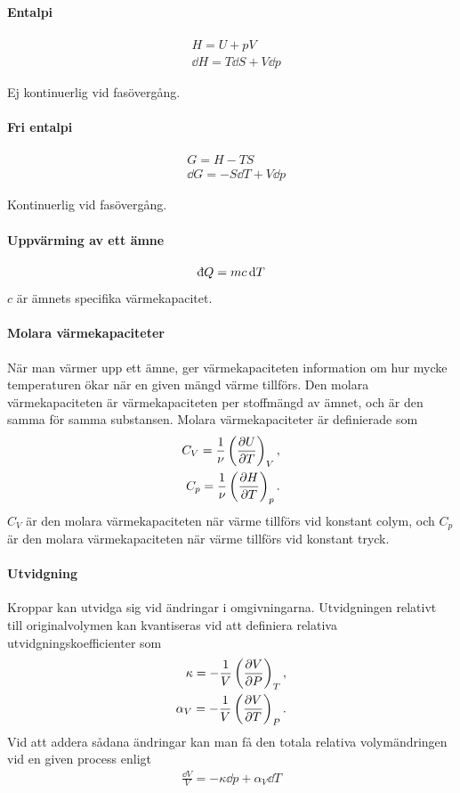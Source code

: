 \paragraph{Entalpi}
\begin{align*}
	& H = U + pV \\
	& \dd{H} = T\dd{S} + V\dd{p}
\end{align*}

Ej kontinuerlig vid fasövergång.

\paragraph{Fri entalpi}
\begin{align*}
	& G = H - TS \\	
	& \dd{G} = -S\dd{T} + V \dd{p}
\end{align*}

Kontinuerlig vid fasövergång.

\paragraph{Uppvärming av ett ämne}
\begin{align*}
	\idd{Q} = mc\dd{T}
\end{align*}
$c$ är ämnets specifika värmekapacitet.

\paragraph{Molara värmekapaciteter}
När man värmer upp ett ämne, ger värmekapaciteten information om hur mycke temperaturen ökar när en given mängd värme tillförs. Den molara värmekapaciteten är värmekapaciteten per stoffmängd av ämnet, och är den samma för samma substansen. Molara värmekapaciteter är definierade som
\begin{align*}
	C_V = \frac{1}{\nu}\left(\pdv{U}{T}\right)_V, \\
	C_p = \frac{1}{\nu}\left(\pdv{H}{T}\right)_p.
\end{align*}
$C_V$ är den molara värmekapaciteten när värme tillförs vid konstant colym, och $C_p$ är den molara värmekapaciteten när värme tillförs vid konstant tryck.

\paragraph{Utvidgning}
Kroppar kan utvidga sig vid ändringar i omgivningarna. Utvidgningen relativt till originalvolymen kan kvantiseras vid att definiera relativa utvidgningskoefficienter som
\begin{align*}
	\kappa = -\frac{1}{V}\left(\pdv{V}{P}\right)_T, \\
	\alpha_V = -\frac{1}{V}\left(\pdv{V}{T}\right)_P.
\end{align*}
Vid att addera sådana ändringar kan man få den totala relativa volymändringen vid en given process enligt
\begin{align*}
	\frac{\dd{V}}{V} = -\kappa\dd{p} + \alpha_V \dd{T}
\end{align*}

